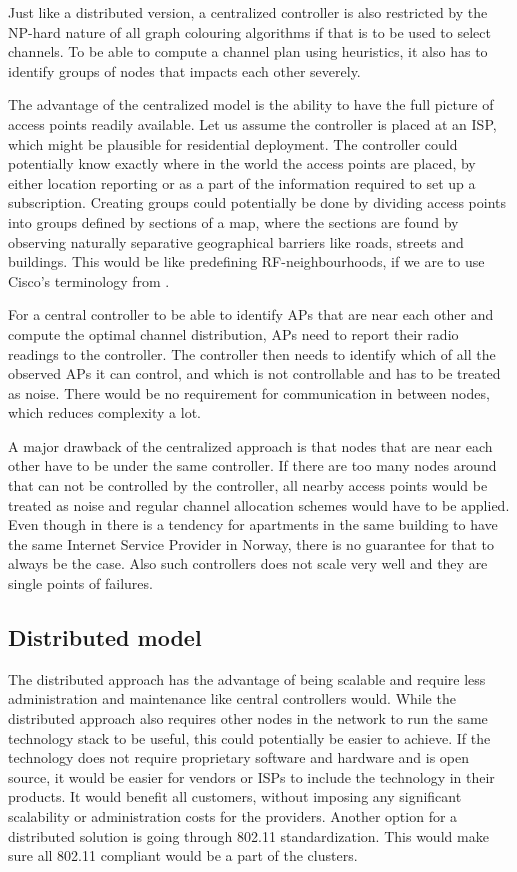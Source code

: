 Just like a distributed version, a centralized controller is also restricted by the NP-hard nature of all graph colouring algorithms if that is to be used to select channels. 
To be able to compute a channel plan using heuristics, it also has to identify groups of nodes that impacts each other severely. 

The advantage of the centralized model is the ability to have the full picture of access points readily available. Let us assume the controller is placed at an ISP, which might be plausible 
for residential deployment.
The controller could potentially know exactly where in the world the access points are placed, by either location reporting or as a part of the information required
to set up a subscription. Creating groups could potentially be done by dividing access points into groups defined by sections of a map, 
where the sections are found by observing naturally separative geographical barriers like roads, streets and buildings. This would be like predefining RF-neighbourhoods, 
if we are to use Cisco's terminology from \cite{ciscoRRM}. 

For a central controller to be able to identify APs that are near each other and compute the optimal channel distribution, APs need to report their radio readings to the controller. 
The controller then needs to identify which of all the observed APs it can control, and which is not controllable and has to be treated as noise. There would be no requirement for
communication in between nodes, which reduces complexity a lot.  

A major drawback of the centralized approach is that nodes that are near each other have to be under the same controller. If there are too many nodes around
that can not be controlled by the controller, all nearby access points would be treated as noise and regular channel allocation schemes would have to be applied.
Even though in there is a tendency for apartments in the same building to have the same Internet Service Provider in Norway, there is no guarantee for that to always be the case.  
Also such controllers does not scale very well and they are single points of failures. 

\subsection{Distributed model}
The distributed approach has the advantage of being scalable and require less administration and maintenance like central controllers would. 
While the distributed approach also requires other nodes in the network to run the same technology stack to be useful, this could potentially be easier to achieve.
If the technology does not require proprietary software and hardware and is open source, it would be easier for vendors or ISPs to include the technology in their products.
It would benefit all customers, without imposing any significant scalability or administration costs for the providers. Another option for a distributed solution is going through
802.11 standardization. This would make sure all 802.11 compliant  would be a part of the clusters. 

